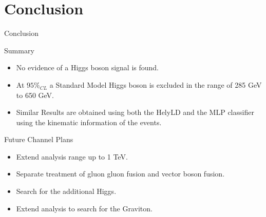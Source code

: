\section{Conclusion}

\begin{frame}{Conclusion}
\begin{center}
Summary
\begin{itemize}
\item
  No evidence of a Higgs boson signal is found.
\item
  At $95\%_{CL}$ a Standard Model Higgs boson is excluded in the range of 285 GeV to 650 GeV.
\item
  Similar Results are obtained using both the HelyLD and the MLP classifier using the kinematic information of the events.
\end{itemize}

\vspace{2em}

Future Channel Plans
\begin{itemize}
\item
  Extend analysis range up to 1 TeV.
\item
  Separate treatment of gluon gluon fusion and vector boson fusion.
\item
  Search for the additional Higgs.
\item
  Extend analysis to search for the Graviton.
\end{itemize}

\end{center}
\end{frame}
